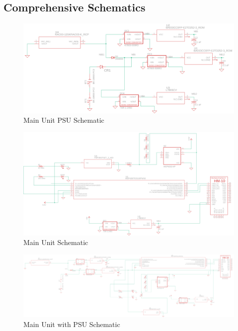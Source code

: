 \documentclass[12pt]{article}
\begin{document}
\appendix
\begin{landscape}
\section{Comprehensive Schematics}
  \begin{center}
  \begin{figure}[H]
    \includegraphics[width=1.6\textwidth, left]{../Modular Design/Main-Unit-PSU/Figures/main-unit-psu.png}
    \caption{Main Unit PSU Schematic}
    \label{fig:main-psu-schematic}
  \end{figure}
  \end{center}


  \begin{center}
  \begin{figure}[H]
    \includegraphics[width=1.6\textwidth, left]{../Appendix/Figures/Main-Unit.png}
    \caption{Main Unit Schematic}
    \label{fig:main-schematic}
  \end{figure}
  \end{center}



  \begin{center}
  \begin{figure}[H]
    \includegraphics[width=\pdfpagewidth,height=0.65\textheight]{../Modular Design/Main-Unit/Figures/main-unit-and-psu.png}
    \caption{Main Unit with PSU Schematic}
    \label{fig:main-with-psu-schematic}
  \end{figure}
  \end{center}


\end{landscape}
\end{document}
